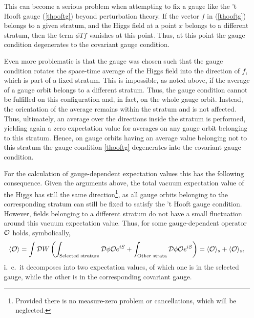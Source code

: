 \documentclass[final,12pt,3p,longtitle]{elsarticle}
\newcommand*{\be}{\begin{equation}}
\newcommand*{\ee}{\end{equation}}
\newcommand*{\pref}[1]{(\ref{#1})}
\newcommand*{\1}{1\!\!\!\bot}
\newcommand*{\op}{{\cal O}}
\begin{document}
This can become a serious problem when attempting to fix a gauge like the 't Hooft gauge \pref{thooftg} beyond perturbation theory. If the vector $f$ in \pref{thooftg} belongs to a given stratum, and the Higgs field at a point $x$ belongs to a different stratum, then the term $\phi T f$ vanishes at this point. Thus, at this point the gauge condition degenerates to the covariant gauge condition.

Even more problematic is that the gauge was chosen such that the gauge condition rotates the space-time average of the Higgs field into the direction of $f$, which is part of a fixed stratum. This is impossible, as noted above, if the average of a gauge orbit belongs to a different stratum. Thus, the gauge condition cannot be fulfilled on this configuration and, in fact, on the whole gauge orbit. Instead, the orientation of the average remains within the stratum and is not affected. Thus, ultimately, an average over the directions inside the stratum is performed, yielding again a zero expectation value for averages on any gauge orbit belonging to this stratum. Hence, on gauge orbits having an average value belonging not to this stratum the gauge condition \eqref{thooftg} degenerates into the covariant gauge condition.

For the calculation of gauge-dependent expectation values this has the following consequence. Given the arguments above, the total vacuum expectation value of the Higgs has still the same direction\footnote{Provided there is no measure-zero problem or cancellations, which will be neglected.}, as all gauge orbits belonging to the corresponding stratum can still be fixed to satisfy the 't Hooft gauge condition. However, fields belonging to a different stratum do not have a small fluctuation around this vacuum expectation value. Thus, for some gauge-dependent operator $\op$ holds, symbolically,
\be
\langle\op\rangle=\int{\cal D}W\left(\int_\text{Selected stratum}{\cal D}\phi \op e^{iS}+\int_\text{Other strata}{\cal D}\phi \op e^{iS}\right)=\langle \op\rangle_s+\langle \op\rangle_o\label{mppi},
\ee
\noindent i.\ e.\ it decomposes into two expectation values, of which one is in the selected gauge, while the other is in the corresponding covariant gauge.
\end{document}
